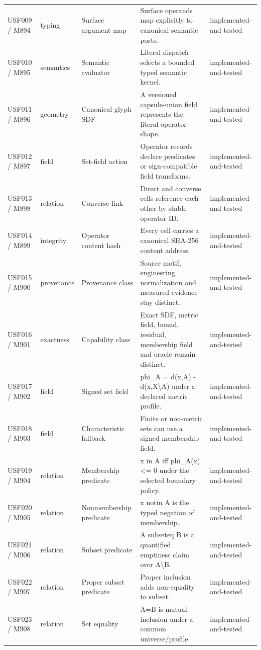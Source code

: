 \documentclass[11pt,a4paper]{article}
\begin{document}
\begin{longtable}{P{20mm}P{15mm}P{28mm}P{70mm}P{20mm}}
USF009 / M894 & typing & Surface argument map & Surface operands map explicitly to canonical semantic ports. & implemented-and-tested \\
USF010 / M895 & semantics & Semantic evaluator & Literal dispatch selects a bounded typed semantic kernel. & implemented-and-tested \\
USF011 / M896 & geometry & Canonical glyph SDF & A versioned capsule-union field represents the literal operator shape. & implemented-and-tested \\
USF012 / M897 & field & Set-field action & Operator records declare predicates or sign-compatible field transforms. & implemented-and-tested \\
USF013 / M898 & relation & Converse link & Direct and converse cells reference each other by stable operator ID. & implemented-and-tested \\
USF014 / M899 & integrity & Operator content hash & Every cell carries a canonical SHA-256 content address. & implemented-and-tested \\
USF015 / M900 & provenance & Provenance class & Source motif, engineering normalization and measured evidence stay distinct. & implemented-and-tested \\
USF016 / M901 & exactness & Capability class & Exact SDF, metric field, bound, residual, membership field and oracle remain distinct. & implemented-and-tested \\
USF017 / M902 & field & Signed set field & phi\_A = d(x,A) - d(x,X\textbackslash{}A) under a declared metric profile. & implemented-and-tested \\
USF018 / M903 & field & Characteristic fallback & Finite or non-metric sets can use a signed membership field. & implemented-and-tested \\
USF019 / M904 & relation & Membership predicate & x in A iff phi\_A(x) \textless{}= 0 under the selected boundary policy. & implemented-and-tested \\
USF020 / M905 & relation & Nonmembership predicate & x notin A is the typed negation of membership. & implemented-and-tested \\
USF021 / M906 & relation & Subset predicate & A subseteq B is a quantified emptiness claim over A\textbackslash{}B. & implemented-and-tested \\
USF022 / M907 & relation & Proper subset predicate & Proper inclusion adds non-equality to subset. & implemented-and-tested \\
USF023 / M908 & relation & Set equality & A=B is mutual inclusion under a common universe/profile. & implemented-and-tested \\

\end{longtable}
\end{document}
